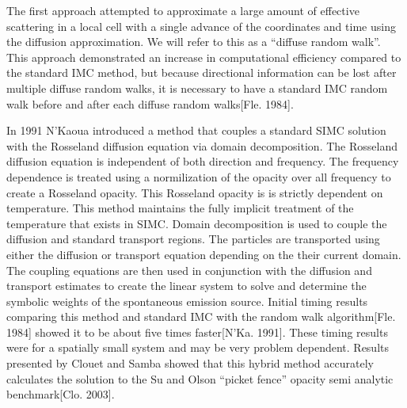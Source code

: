 	The first approach attempted to approximate a large amount of effective scattering in a local cell with a single advance of the coordinates and time using the diffusion approximation. We will refer to this as a ``diffuse random walk''. This approach demonstrated an increase in computational efficiency compared to the  standard IMC method, but because directional information can be lost after multiple diffuse random walks, it is necessary to have a standard IMC random walk before and after each diffuse random walks[Fle. 1984].

	In 1991 N'Kaoua introduced a method that couples a standard SIMC solution with the Rosseland diffusion equation via domain decomposition. The Rosseland diffusion equation is independent of both direction and frequency. The frequency dependence is treated using a normilization of the opacity over all frequency to create a Rosseland opacity. This Rosseland opacity is is strictly dependent on temperature. This method maintains the fully implicit treatment of the temperature that exists in SIMC. Domain decomposition is used to couple the diffusion and standard transport regions. The particles are transported using either the diffusion or transport equation depending on the their current domain. The coupling equations are then used in conjunction with the diffusion and transport estimates to create the linear system to solve and determine the symbolic weights of the spontaneous emission source. Initial timing results comparing this method and standard IMC with the random walk algorithm[Fle. 1984] showed it to be about five times faster[N'Ka. 1991]. These timing results were for a spatially small system and may be very problem dependent. Results presented by Clouet and Samba showed that this hybrid method accurately calculates the solution to the Su and Olson ``picket fence'' opacity semi analytic benchmark[Clo. 2003].

